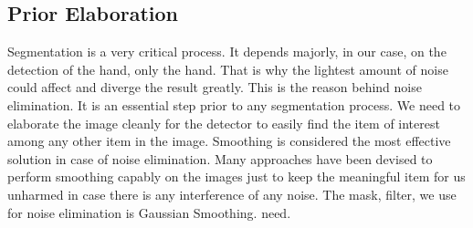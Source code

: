 \documentclass[12pt,fleqn]{book} %
\begin{document}
\subsection{Prior Elaboration}
Segmentation is a very critical process. It depends majorly, in our case, on the detection of the hand, only the hand. That is why the lightest amount of noise could affect and diverge the result greatly. This is the reason behind noise elimination. It is an essential step prior to any segmentation process. We need to elaborate the image cleanly for the detector to easily find the item of interest among any other item in the image. Smoothing is considered the most effective solution in case of noise elimination. Many approaches have been devised to perform smoothing capably on the images just to keep the meaningful item for us unharmed in case there is any interference of any noise. The mask, filter, we use for noise elimination is Gaussian Smoothing.
need.\bigskip
\end{document}
